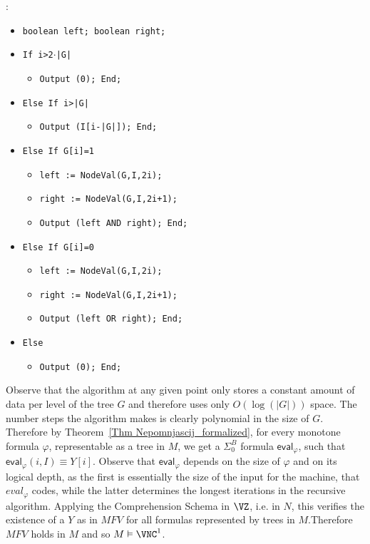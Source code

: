\documentclass{LMCS}
\newcommand{\abs}[1]{\left\vert#1\right\vert}
\newenvironment{proof}{\QuadSpace\par\noindent{\bf
Proof}:}{\EndProof\HalfSpace} \fi
\newcommand{\QuadSpace}{}\newcommand{\HalfSpace}{}\newcommand{\FullSpace}{}\newcommand{\EndProof}{ \hfill \vrule width 1ex height 1ex depth 0pt }
\newenvironment{proof}{

\smallskip
\noindent\emph{Proof.}}{\hfill\(\Box\)
\bigskip
} \fi
\begin{document}
\begin{proof}
{\small
\begin{itemize}
  \item \verb"boolean left; boolean right;"
  \item \verb"If i>2"$\cdot$\verb"|G|"
  \begin{itemize}
    \item \verb"Output (0); End;"
  \end{itemize}
  \item \verb"Else If i>|G|"
  \begin{itemize}
    \item \verb"Output (I[i-|G|]); End;"
  \end{itemize}
  \item \verb"Else If G[i]=1"
  \begin{itemize}
    \item \verb"left := NodeVal(G,I,2i);"
    \item \verb"right := NodeVal(G,I,2i+1);"
    \item \verb"Output (left AND right); End;"
\end{itemize}
  \item \verb"Else If G[i]=0"
  \begin{itemize}
    \item \verb"left := NodeVal(G,I,2i);"
    \item \verb"right := NodeVal(G,I,2i+1);"
    \item \verb"Output (left OR right); End;"
\end{itemize}
    \item \verb"Else"
  \begin{itemize}
    \item \verb"Output (0); End;"
  \end{itemize}
\end{itemize}
} 
\noindent Observe that the algorithm at any given point only stores a
constant amount of data per level of the tree $G$ and therefore uses
only $O(\log(\abs{G}))$ space. The number steps the algorithm makes is
clearly polynomial in the size of $G$. Therefore by Theorem~\ref{Thm
  Nepomnjascij_formalized}, for every monotone formula $\varphi$,
representable as a tree in $M$, we get a $\Sigma^B_0$ formula
$\mathsf{eval}_{\varphi}$, such that
$\mathsf{eval}_{\varphi}(i,I)\equiv Y[i]$. Observe that
$\mathsf{eval}_{\varphi}$ depends on the size of $\varphi$ and on its
logical depth, as the first is essentially the size of the input for
the machine, that $eval_{\varphi}$ codes, while the latter determines
the longest iterations in the recursive algorithm. Applying the
Comprehension Schema in $\VZ$, i.e. in $N$, this verifies the
existence of a $Y$ as in $MFV$ for all formulas represented by trees
in $M$.Therefore $MFV$ holds in $M$ and so $M\vDash\VNC^1$.
\end{proof}
\end{document}
